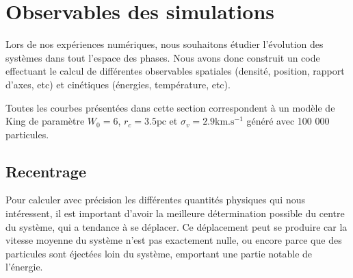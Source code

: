 	\section{Observables des simulations}  %


		Lors de nos expériences numériques, nous souhaitons étudier l'évolution des systèmes dans tout l'espace des
		phases. Nous avons donc construit un code effectuant le calcul de différentes observables spatiales
		(densité, position, rapport d'axes, etc) et cinétiques (énergies, température, etc).

		Toutes les courbes présentées dans cette section correspondent à un modèle de King de paramètre $W_0=6$, $r_c =
		3.5\mathrm{pc}$ et $\sigma_v = 2.9 \mathrm{km}.\mathrm{s}^{-1}$ généré avec 100 000 particules.



		\subsection{Recentrage}

			Pour calculer avec précision les différentes quantités physiques qui nous intéressent, il est
			important d'avoir la meilleure détermination possible du centre du système, qui a tendance à se
			déplacer. Ce déplacement peut se produire car la vitesse moyenne du système n'est pas exactement
			nulle, ou encore parce que des particules sont éjectées loin du système, emportant une partie
			notable de l'énergie.


